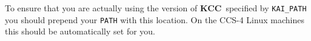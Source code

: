 \documentclass[10pt]{nmemo}
\newcommand{\comp}[1]{\normalfont\normalsize\texttt{#1}}
\newcommand{\kcc}{{\normalfont\bfseries KCC}}
\begin{document}
    

To ensure that you are actually using the version of \kcc\ specified by
\comp{KAI\_PATH} you should prepend your \comp{PATH} with this
location.  On the CCS-4 Linux machines this should be automatically
set for you. 
\end{document}
